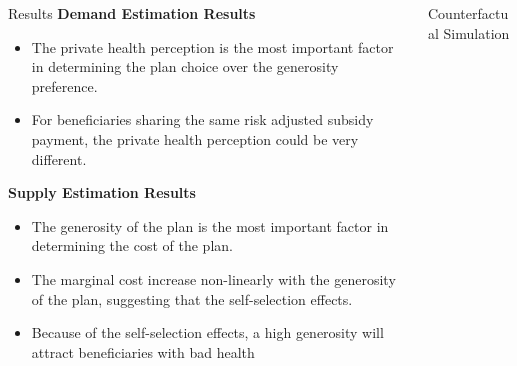 \documentclass{beamer}
\begin{document}
\begin{frame}[t]
\begin{columns}[t]
\begin{column}{.3\textwidth}
      \begin{block}{Results}
      \textbf{Demand Estimation Results}
      
      \begin{itemize}
        \item The private health perception is the most important factor in determining the plan choice over the generosity preference.
        \item For beneficiaries sharing the same risk adjusted subsidy payment, the private health perception could be very different.
      \end{itemize}
      
    \textbf{Supply Estimation Results}
      
      \begin{itemize}
        \item The generosity of the plan is the most important factor in determining the cost of the plan.
        \item The marginal cost increase non-linearly with the generosity of the plan, suggesting that the self-selection effects.
        \item Because of the self-selection effects, a high generosity will attract beneficiaries with bad health 
      \end{itemize}
      \end{block}

    \end{column}
    \begin{column}{.25 \textwidth}
      \begin{block}{Counterfactual Simulation}
        \textbf{}


\end{block}
\end{column}
\end{columns}
\end{frame}
\end{document}
